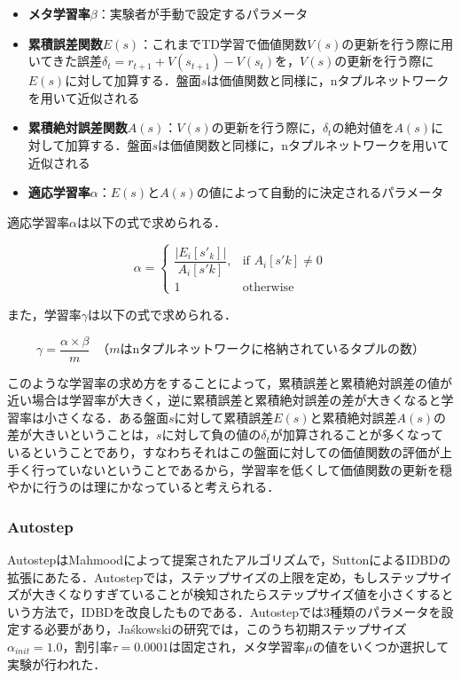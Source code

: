 \documentclass{suribt}
\begin{document}
\begin{itemize}
\item \textbf{メタ学習率${\beta}$}：実験者が手動で設定するパラメータ
\item \textbf{累積誤差関数$E(s)$}：これまでTD学習で価値関数$V(s)$の更新を行う際に用いてきた誤差${\delta}_t = r_{t+1} + V(s_{t+1}) - V(s_t)$を，$V(s)$の更新を行う際に$E(s)$に対して加算する．盤面$s$は価値関数と同様に，nタプルネットワークを用いて近似される
\item \textbf{累積絶対誤差関数$A(s)$}：$V(s)$の更新を行う際に，${\delta}_t$の絶対値を$A(s)$に対して加算する．盤面$s$は価値関数と同様に，nタプルネットワークを用いて近似される
\item \textbf{適応学習率${\alpha}$}：$E(s)$と$A(s)$の値によって自動的に決定されるパラメータ
\end{itemize}

適応学習率${\alpha}$は以下の式で求められる．

\[
{\alpha} = 
\begin{cases}
\dfrac{|E_i[s'_k]|}{A_i[s'k]}, & \text{if $A_i[s'k] \neq 0$} \\
1 & \text{otherwise}
\end{cases}
\]

また，学習率${\gamma}$は以下の式で求められる．

\[
{\gamma} = \dfrac{{\alpha} \times {\beta}}{m} \;\; \text{（$m$はnタプルネットワークに格納されているタプルの数）}
\]

このような学習率の求め方をすることによって，累積誤差と累積絶対誤差の値が近い場合は学習率が大きく，逆に累積誤差と累積絶対誤差の差が大きくなると学習率は小さくなる．ある盤面$s$に対して累積誤差$E(s)$と累積絶対誤差$A(s)$の差が大きいということは，$s$に対して負の値の${\delta}_t$が加算されることが多くなっているということであり，すなわちそれはこの盤面に対しての価値関数の評価が上手く行っていないということであるから，学習率を低くして価値関数の更新を穏やかに行うのは理にかなっていると考えられる．

\subsubsection{Autostep}
AutostepはMahmoodによって提案されたアルゴリズムで，SuttonによるIDBDの拡張にあたる．Autostepでは，ステップサイズの上限を定め，もしステップサイズが大きくなりすぎていることが検知されたらステップサイズ値を小さくするという方法で，IDBDを改良したものである．Autostepでは3種類のパラメータを設定する必要があり，Ja\'{s}kowskiの研究では，このうち初期ステップサイズ${\alpha}_{init} = 1.0$，割引率${\tau} = 0.0001$は固定され，メタ学習率${\mu}$の値をいくつか選択して実験が行われた．
\end{document}
